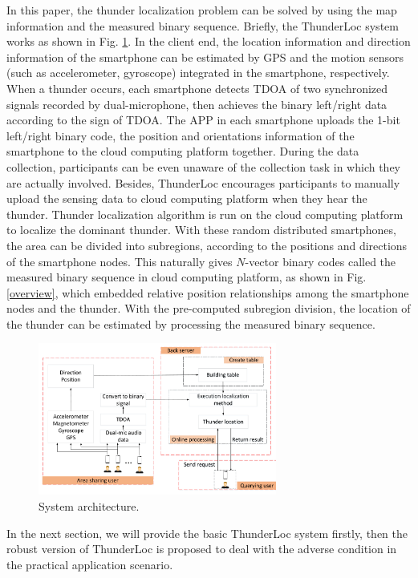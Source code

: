  In this paper, the thunder localization problem can be solved by using the map information and the measured binary sequence.
 Briefly, the ThunderLoc system works as shown in Fig. \ref{architecture}. 
 In the client end, the location information and direction information of the smartphone can be estimated by GPS and the motion sensors (such as accelerometer, gyroscope) integrated in the smartphone, respectively.
 When a thunder occurs, each smartphone detects TDOA of two synchronized signals recorded by dual-microphone, then achieves the binary left/right data according to the sign of TDOA.
 The APP in each smartphone uploads the 1-bit left/right binary code, the position and orientations information of the smartphone to the cloud computing platform together.
 During the data collection, participants can be even unaware of the collection task in which they are actually involved.
 Besides, ThunderLoc encourages participants to manually upload the sensing data to cloud computing platform when they hear the thunder.
 Thunder localization algorithm is run on the cloud computing platform to localize the dominant thunder.
With these random distributed smartphones, the area can be divided into subregions, according to the positions and directions of the smartphone nodes.
This naturally gives $N$-vector binary codes called the measured binary sequence in cloud computing platform,
as shown in Fig. \ref{overview}, which embedded relative position relationships among the smartphone nodes and the thunder. 
With the pre-computed subregion division, the location of the thunder can be estimated by processing the measured binary sequence.
   \vspace{-4mm}
  \begin{figure}[htb]
            \setlength{\abovecaptionskip}{0pt}
            \centering
            \includegraphics[scale=2,height=5.0cm]{fig/architecture.pdf}
			 \vspace{1mm}
            \caption{\label{architecture}System architecture.}
            \vspace{-4mm}
  \end{figure}
  
In the next section, we will provide the basic ThunderLoc system firstly, 
then the robust version of ThunderLoc is proposed to deal with the adverse condition in the practical application scenario.
  




